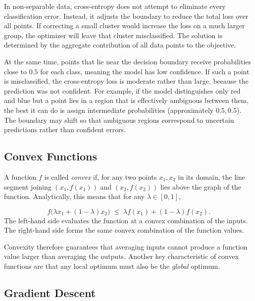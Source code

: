 In non-separable data, cross-entropy does not attempt to eliminate every classification error. Instead, it adjusts the boundary to reduce the total loss over all points. If correcting a small cluster would increase the loss on a much larger group, the optimizer will leave that cluster misclassified. The solution is determined by the aggregate contribution of all data points to the objective.

At the same time, points that lie near the decision boundary receive probabilities close to $0.5$ for each class, meaning the model has low confidence. If such a point is misclassified, the cross-entropy loss is moderate rather than large, because the prediction was not confident. For example, if the model distinguishes only red and blue but a point lies in a region that is effectively ambiguous between them, the best it can do is assign intermediate probabilities (approximately $0.5, 0.5$). The boundary may shift so that ambiguous regions correspond to uncertain predictions rather than confident errors.

\bigskip

\subsection{Convex Functions}

\medskip

A function $f$ is called \emph{convex} if, for any two points $x_1, x_2$ in its domain, the line segment joining $(x_1, f(x_1))$ and $(x_2, f(x_2))$ lies above the graph of the function. Analytically, this means that for any $\lambda \in [0,1]$,

\[
f\big(\lambda x_1 + (1-\lambda)x_2\big)
\;\le\;
\lambda f(x_1) + (1-\lambda) f(x_2).
\]
The left-hand side evaluates the function at a convex combination of the inputs.  
The right-hand side forms the same convex combination of the function values.  

Convexity therefore guarantees that averaging inputs cannot produce a function value larger than averaging the outputs. Another key characteristic of convex functions are that any local optimum must also be the \textit{global} optimum. 

\bigskip

\subsection{Gradient Descent}

\medskip

